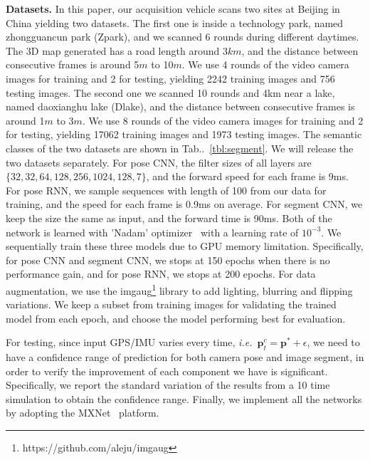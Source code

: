 \documentclass[10pt,twocolumn,letterpaper]{article}
\makeatletter
\newcommand{\tabref}[1]{Tab\onedot~\ref{#1}}
\newcommand{\ve}[1]{{\mathbf #1}} %
\DeclareRobustCommand\onedot{\futurelet\@let@token\@onedot}
\def\onedot{\ifx\@let@token.\else.\null\fi\xspace}
\def\ie{\emph{i.e.}}
\makeatother
\begin{document}
\textbf{Datasets.} In this paper, our acquisition vehicle scans two sites at Beijing in China yielding two datasets. 
The first one is inside a technology park, named zhongguancun park (Zpark), and we scanned 6 rounds during different daytimes. The 3D map generated has a road length around 3$km$, and the distance between consecutive frames is around 5$m$ to 10$m$. We use 4 rounds of the video camera images for training and 2 for testing, yielding 2242 training images and 756 testing images. 
The second one we scanned 10 rounds and 4km near a lake, named daoxianghu lake (Dlake), and the distance between consecutive frames is around 1$m$ to 3$m$. 
We use 8 rounds of the video camera images for training and 2 for testing, yielding 17062 training images and 1973 testing images. 
The semantic classes of the two datasets are shown in \tabref{tbl:segment}. We will release the two datasets separately. %
For pose CNN, the filter sizes of all layers are $\{32, 32, 64, 128, 256, 1024, 128, 7\}$, and the forward speed for each frame is 9ms. For pose RNN, we sample sequences with length of 100 from our data for training, and the speed for each frame is 0.9ms on average.
For segment CNN, we keep the size the same as input, and the forward time is 90ms. 
Both of the network is learned with 'Nadam' optimizer~\cite{dozat2016incorporating} with a learning rate of $10^{-3}$. We sequentially train these three models due to GPU memory limitation.
Specifically, for pose CNN and segment CNN, we stops at 150 epochs when there is no performance gain, and for pose RNN, we stops at 200 epochs. For data augmentation, we use the imgaug\footnote{https://github.com/aleju/imgaug} library to add lighting, blurring and flipping variations. We keep a subset from training images for validating the trained model from each epoch, and choose the model performing best for evaluation.

For testing, since input GPS/IMU varies every time, \ie~$\ve{p}_t^c=\ve{p}^*+\epsilon$, we need to have a confidence range of prediction for both camera pose and image segment, in order to verify the improvement of each component we have is significant. Specifically, we report the standard variation of the results from a 10 time simulation to obtain the confidence range. Finally, we implement all the networks by adopting the MXNet~\cite{ChenLLLWWXXZZ15} platform.
\end{document}
